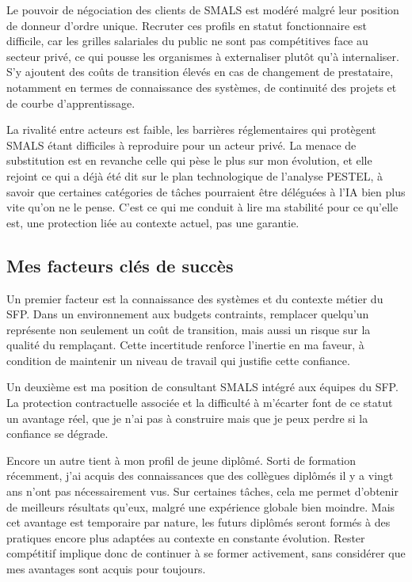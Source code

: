 \documentclass[12pt, a4paper]{article}
\begin{document}
Le pouvoir de négociation des clients de SMALS est modéré 
malgré leur position de donneur d'ordre unique. Recruter 
ces profils en statut fonctionnaire est difficile, car les 
grilles salariales du public ne sont pas compétitives face 
au secteur privé, ce qui pousse les organismes à externaliser 
plutôt qu'à internaliser. S'y ajoutent des coûts de 
transition élevés en cas de changement de prestataire, 
notamment en termes de connaissance des systèmes, de continuité des projets et de courbe 
d'apprentissage.

La rivalité entre acteurs est faible, les barrières 
réglementaires qui protègent SMALS étant difficiles à 
reproduire pour un acteur privé. La menace de substitution 
est en revanche celle qui pèse le plus sur mon évolution, et elle 
rejoint ce qui a déjà été dit sur le plan technologique de l'analyse PESTEL, 
à savoir que certaines catégories de tâches pourraient être 
déléguées à l'IA bien plus vite qu'on ne le pense. C'est ce qui me 
conduit à lire ma stabilité pour ce qu'elle est, une 
protection liée au contexte actuel, pas une garantie.

\subsection{Mes facteurs clés de succès}

Un premier facteur est la connaissance des systèmes et du 
contexte métier du SFP. Dans un environnement aux budgets 
contraints, remplacer quelqu'un représente non seulement 
un coût de transition, mais aussi un risque sur la qualité 
du remplaçant. Cette incertitude renforce l'inertie en ma 
faveur, à condition de maintenir un niveau de travail qui 
justifie cette confiance.

Un deuxième est ma position de consultant SMALS intégré aux 
équipes du SFP. La protection contractuelle associée et la 
difficulté à m'écarter font de ce statut un avantage 
réel, que je n'ai pas à construire mais que je peux 
perdre si la confiance se dégrade.

Encore un autre tient à mon profil de jeune diplômé. Sorti 
de formation récemment, j'ai acquis des connaissances que des 
collègues diplômés il y a vingt ans n'ont pas nécessairement 
vus. Sur certaines tâches, cela me permet d'obtenir de 
meilleurs résultats qu'eux, malgré une expérience globale 
bien moindre. Mais cet avantage est temporaire par nature, les 
futurs diplômés seront formés à des pratiques encore plus 
adaptées au contexte en constante évolution. Rester compétitif implique 
donc de continuer à se former activement, sans considérer 
que mes avantages sont acquis pour toujours.
\end{document}
